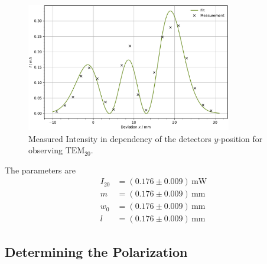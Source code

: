 \begin{figure}
	\centering
	\includegraphics[width=0.8\textwidth]{content/plots/TEM02.pdf}
	\caption{Measured Intensity in dependency of the detectors $y$-position for observing $\text{TEM}_{20}$.}
	\label{fig:TEM02}
\end{figure}
The parameters are
\begin{align*}
    I_{20} &= \left( 0.176\pm0.009 \right) \, \text{mW} \\
    m &= \left( 0.176\pm0.009 \right) \, \text{mm} \\
    w_0 &= \left( 0.176\pm0.009 \right) \, \text{mm} \\
    l &= \left( 0.176\pm0.009 \right) \, \text{mm}
\end{align*}

\subsection{Determining the Polarization}

